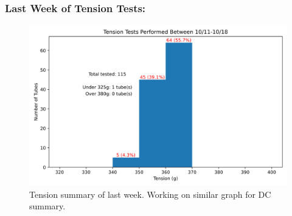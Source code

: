 \documentclass{beamer}
\begin{document}
\begin{frame}
	\frametitle{Last Week of Tension Tests:}
	\begin{figure}
		\includegraphics[width=0.8\linewidth]{"last_week_tt.png"}
		\caption[width=0.5\linewidth]{Tension summary of last week. Working on similar graph for DC summary.}
	\end{figure}
	
	
\end{frame}
\end{document}

